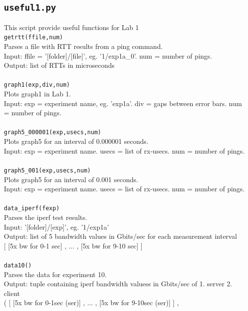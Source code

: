 \documentclass[]{scrartcl}
\begin{document}
\subsection{\texttt{useful1.py}}
This script provide useful functions for Lab 1\\

\noindent\texttt{getrtt(ffile,num)}   \\
Parses a file with RTT results from a ping command.\\ 
Input: ffile = '[folder]/[file]', eg. '1/exp1a{\_}0'. num = number of pings.  \\
Output: list of RTTs in microseconds  \\
\\
\texttt{graph1(exp,div,num)}  \\
Plots graph1 in Lab 1.  \\
Input: exp = experiment name, eg. 'exp1a'. div = gaps between error bars. num = number of pings.  \\
\\
\texttt{graph5{\_}000001(exp,usecs,num)}  \\
Plots graph5 for an interval of 0.000001 seconds.  \\
Input: exp = experiment name. usecs = list of rx-usecs. num = number of pings.  \\
\\
\texttt{graph5{\_}001(exp,usecs,num)}  \\
Plots graph5 for an interval of 0.001 seconds.  \\
Input: exp = experiment name. usecs = list of rx-usecs. num = number of pings.  \\
\\
\texttt{data{\_}iperf(fexp)}  \\
Parses the iperf test results.\\
Input: '[folder]/[exp]', eg. '1/exp1a'   \\
Output: list of 5 bandwidth values in Gbits/sec for each measurement interval  \\
{[  [5x bw for 0-1 sec]  ,  ...  ,  [5x bw for 9-10 sec]  ]} \\
\\
\texttt{data10()}  \\
Parses the data for experiment 10.\\
Output:  tuple containing iperf bandwidth valuess in Gbits/sec of 1. server 2. client  \\
(  [  [5x bw for 0-1sec (ser)]  ,  ... ,  [5x bw for 9-10sec (ser)]  ] ,  \\
\end{document}
